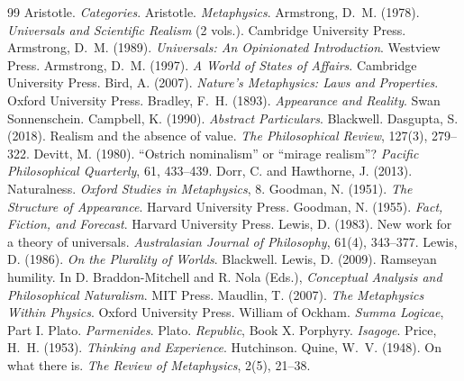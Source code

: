\documentclass{situationist-preprint}
\begin{document}
\begin{thebibliography}{99}\small
{} Aristotle. \emph{Categories}.
 Aristotle. \emph{Metaphysics}.
 Armstrong, D.~M. (1978). \emph{Universals and Scientific Realism} (2 vols.). Cambridge University Press.
 Armstrong, D.~M. (1989). \emph{Universals: An Opinionated Introduction}. Westview Press.
 Armstrong, D.~M. (1997). \emph{A World of States of Affairs}. Cambridge University Press.
 Bird, A. (2007). \emph{Nature's Metaphysics: Laws and Properties}. Oxford University Press.
 Bradley, F.~H. (1893). \emph{Appearance and Reality}. Swan Sonnenschein.
 Campbell, K. (1990). \emph{Abstract Particulars}. Blackwell.
 Dasgupta, S. (2018). Realism and the absence of value. \emph{The Philosophical Review}, 127(3), 279--322.
 Devitt, M. (1980). \enquote{Ostrich nominalism} or \enquote{mirage realism}? \emph{Pacific Philosophical Quarterly}, 61, 433--439.
 Dorr, C. and Hawthorne, J. (2013). Naturalness. \emph{Oxford Studies in Metaphysics}, 8.
 Goodman, N. (1951). \emph{The Structure of Appearance}. Harvard University Press.
 Goodman, N. (1955). \emph{Fact, Fiction, and Forecast}. Harvard University Press.
 Lewis, D. (1983). New work for a theory of universals. \emph{Australasian Journal of Philosophy}, 61(4), 343--377.
 Lewis, D. (1986). \emph{On the Plurality of Worlds}. Blackwell.
 Lewis, D. (2009). Ramseyan humility. In D. Braddon-Mitchell and R. Nola (Eds.), \emph{Conceptual Analysis and Philosophical Naturalism}. MIT Press.
 Maudlin, T. (2007). \emph{The Metaphysics Within Physics}. Oxford University Press.
 William of Ockham. \emph{Summa Logicae}, Part I.
 Plato. \emph{Parmenides}.
 Plato. \emph{Republic}, Book X.
 Porphyry. \emph{Isagoge}.
 Price, H.~H. (1953). \emph{Thinking and Experience}. Hutchinson.
 Quine, W.~V. (1948). On what there is. \emph{The Review of Metaphysics}, 2(5), 21--38.

\end{thebibliography}
\end{document}
